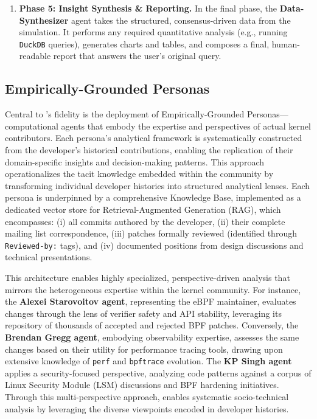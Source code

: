 \begin{enumerate}
\item \textbf{Phase 5: Insight Synthesis \& Reporting.} In the final phase, the \textbf{Data-Synthesizer} agent takes the structured, consensus-driven data from the simulation. It performs any required quantitative analysis (e.g., running \texttt{DuckDB} queries), generates charts and tables, and composes a final, human-readable report that answers the user's original query.
\end{enumerate}


\subsection{Empirically-Grounded Personas}

Central to \sys's fidelity is the deployment of Empirically-Grounded Personas—computational agents that embody the expertise and perspectives of actual kernel contributors. Each persona's analytical framework is systematically constructed from the developer's historical contributions, enabling the replication of their domain-specific insights and decision-making patterns. This approach operationalizes the tacit knowledge embedded within the community by transforming individual developer histories into structured analytical lenses. Each persona is underpinned by a comprehensive Knowledge Base, implemented as a dedicated vector store for Retrieval-Augmented Generation (RAG), which encompasses: (i) all commits authored by the developer, (ii) their complete mailing list correspondence, (iii) patches formally reviewed (identified through \texttt{Reviewed-by:} tags), and (iv) documented positions from design discussions and technical presentations.

This architecture enables highly specialized, perspective-driven analysis that mirrors the heterogeneous expertise within the kernel community. For instance, the \textbf{Alexei Starovoitov agent}, representing the eBPF maintainer, evaluates changes through the lens of verifier safety and API stability, leveraging its repository of thousands of accepted and rejected BPF patches. Conversely, the \textbf{Brendan Gregg agent}, embodying observability expertise, assesses the same changes based on their utility for performance tracing tools, drawing upon extensive knowledge of \texttt{perf} and \texttt{bpftrace} evolution. The \textbf{KP Singh agent} applies a security-focused perspective, analyzing code patterns against a corpus of Linux Security Module (LSM) discussions and BPF hardening initiatives. Through this multi-perspective approach, \sys enables systematic socio-technical analysis by leveraging the diverse viewpoints encoded in developer histories.


